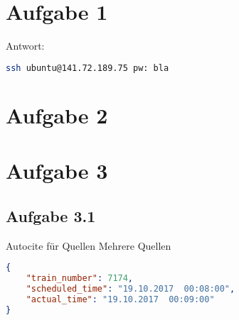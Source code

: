 \chapter*{Aufgabe 1}


Antwort:
\begin{lstlisting}[language=bash, caption=Nachrichtenformat eines neuen Zugereignisses, label={lst:ssh}]
ssh ubuntu@141.72.189.75 pw: bla
\end{lstlisting}

\chapter*{Aufgabe 2}


\chapter*{Aufgabe 3}


\section*{Aufgabe 3.1}

Autocite für Quellen \autocite[Vgl.][S. 42]{ME12}
Mehrere Quellen \cites[Vgl.][S. 10]{ME12}[Vgl.][S. 100]{TD15}

\begin{lstlisting}[language=json, caption=Nachrichtenformat eines neuen Zugereignisses, label={lst:generation}]
{
    "train_number": 7174,
    "scheduled_time": "19.10.2017  00:08:00",
    "actual_time": "19.10.2017  00:09:00"
}
\end{lstlisting}

